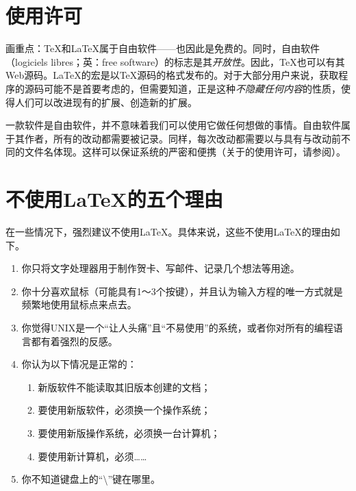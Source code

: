 \section*{使用许可}

画重点：\TeX 和\LaTeX 属于自由软件——也因此是免费的。同时，自由软件（logiciels libres；英：free software）的标志是其\textit{开放性}。因此，\TeX 也可以有其Web源码。\LaTeX 的宏是以\TeX 源码的格式发布的。对于大部分用户来说，获取程序的源码可能不是首要考虑的，但需要知道，正是这种\textit{不隐藏任何内容}的性质，使得人们可以改进现有的扩展、创造新的扩展。

一款软件是自由软件，并不意味着我们可以使用它做任何想做的事情。自由软件属于其作者，所有的改动都需要被记录。同样，每次改动都需要以与具有与改动前不同的文件名体现。这样可以保证系统的严密和便携（关于\LaTeXe 的使用许可，请参阅）。

\section*{不使用\LaTeX 的五个理由}

在一些情况下，强烈建议不使用\LaTeX 。具体来说，这些不使用\LaTeX 的理由如下。

\begin{enumerate}
    \item 你只将文字处理器用于制作贺卡、写邮件、记录几个想法等用途。
    \item 你十分喜欢鼠标（可能具有1～3个按键），并且认为输入方程的唯一方式就是频繁地使用鼠标点来点去。
    \item 你觉得UNIX是一个“让人头痛”且“不易使用”的系统，或者你对所有的编程语言都有着强烈的反感。
    \item 你认为以下情况是正常的：
        \begin{enumerate}
            \item 新版软件不能读取其旧版本创建的文档；
            \item 要使用新版软件，必须换一个操作系统；
            \item 要使用新版操作系统，必须换一台计算机；
            \item 要使用新计算机，必须……
        \end{enumerate}
    \item 你不知道键盘上的“\backslash”键在哪里。
\end{enumerate}

